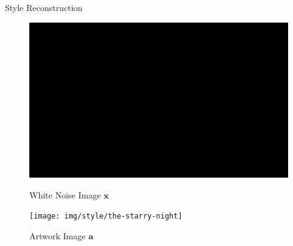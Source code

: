 \documentclass{beamer}
\begin{document}
\begin{frame}{Style Reconstruction}
\begin{figure}[ht]
    \begin{minipage}[b]{0.45\linewidth}
        \centering
        \includegraphics[width=\textwidth]{img/style/noise}
        \caption*{White Noise Image $\mathbf{x}$}
    \end{minipage}
    \hspace{0.5cm}
    \begin{minipage}[b]{0.45\linewidth}
        \centering
        \texttt{[image: img/style/the-starry-night]}
        \caption*{Artwork Image $\mathbf{a}$}
    \end{minipage}
\end{figure}
\end{frame}
\end{document}

